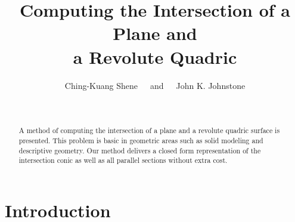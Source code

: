 


\title{Computing the Intersection of a Plane and \\ 
       a Revolute Quadric}

\author{Ching-Kuang Shene\ \ \ and\ \ \ John K. Johnstone}

\date{\ }

\newtheorem{example}{Example}[section]
\newtheorem{property}{Property}[section]
\newtheorem{definition}{Definition}[section]
\newtheorem{theorem}{Theorem}[section]
\newtheorem{lemma}{Lemma}[section]
\newtheorem{corollary}{Corollary}[section]
\newtheorem{remark}{Remark}[section]

\newcommand{\DoubleSpace}{\edef\baselinestretch{1.4}\Large\normalsize}
\newcommand{\QED}{\ \ \ \rule{2mm}{3mm}\\}
\newcommand{\arrow}[1]{\vec{\bf #1}}

\setlength{\oddsidemargin}{0pt}
\setlength{\evensidemargin}{0pt}
\setlength{\headsep}{0pt}
\setlength{\topmargin}{0pt}
\setlength{\textheight}{8.75in}
\setlength{\textwidth}{6.5in}



\maketitle

\begin{abstract}
     A method of computing the intersection of a plane and a revolute quadric
surface is presented.  This problem is basic in geometric areas such as solid
modeling and descriptive geometry.   Our method delivers a closed form 
representation of the intersection conic as well as all parallel sections 
without extra cost.   
\end{abstract}


\section{Introduction}
\label{section:intro}


